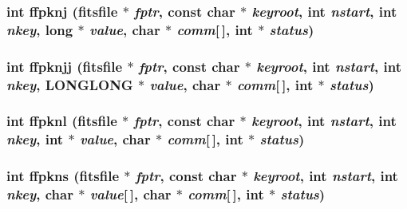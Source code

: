 \subsubsection{\setlength{\rightskip}{0pt plus 5cm}int ffpknj (\bf{fitsfile} $\ast$ {\em fptr}, const char $\ast$ {\em keyroot}, int {\em nstart}, int {\em nkey}, long $\ast$ {\em value}, char $\ast$ {\em comm}[$\,$], int $\ast$ {\em status})}\label{test_2shm__client_2fitsio_8h_8d79acce0d2b0239c334aceede23c738}


\subsubsection{\setlength{\rightskip}{0pt plus 5cm}int ffpknjj (\bf{fitsfile} $\ast$ {\em fptr}, const char $\ast$ {\em keyroot}, int {\em nstart}, int {\em nkey}, \bf{LONGLONG} $\ast$ {\em value}, char $\ast$ {\em comm}[$\,$], int $\ast$ {\em status})}\label{test_2shm__client_2fitsio_8h_c2b99d9ff15c6f48a24d280e0db042f0}


\subsubsection{\setlength{\rightskip}{0pt plus 5cm}int ffpknl (\bf{fitsfile} $\ast$ {\em fptr}, const char $\ast$ {\em keyroot}, int {\em nstart}, int {\em nkey}, int $\ast$ {\em value}, char $\ast$ {\em comm}[$\,$], int $\ast$ {\em status})}\label{test_2shm__client_2fitsio_8h_5ee226d4cad1422b59808f83662bdd0a}


\subsubsection{\setlength{\rightskip}{0pt plus 5cm}int ffpkns (\bf{fitsfile} $\ast$ {\em fptr}, const char $\ast$ {\em keyroot}, int {\em nstart}, int {\em nkey}, char $\ast$ {\em value}[$\,$], char $\ast$ {\em comm}[$\,$], int $\ast$ {\em status})}\label{test_2shm__client_2fitsio_8h_4cc9952d07023a429d09abe9fb29f654}


